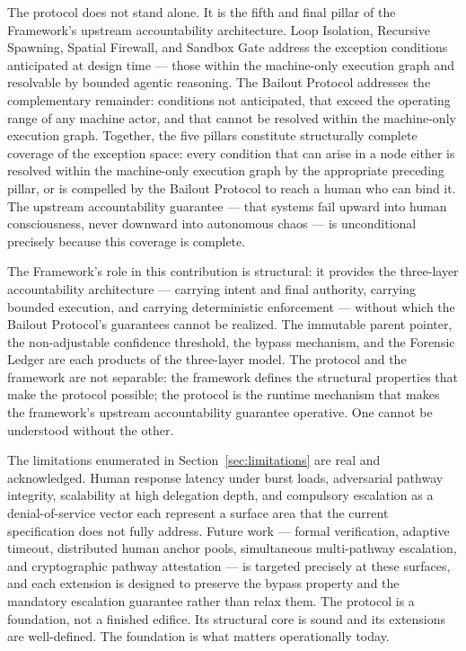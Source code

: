 The protocol does not stand alone. It is the fifth and final pillar of the \bxthree{} Framework's upstream accountability architecture. Loop Isolation, Recursive Spawning, Spatial Firewall, and Sandbox Gate address the exception conditions anticipated at design time — those within the machine-only execution graph and resolvable by bounded agentic reasoning. The Bailout Protocol addresses the complementary remainder: conditions not anticipated, that exceed the operating range of any machine actor, and that cannot be resolved within the machine-only execution graph. Together, the five pillars constitute structurally complete coverage of the exception space: every condition that can arise in a \bxthree{} node either is resolved within the machine-only execution graph by the appropriate preceding pillar, or is compelled by the Bailout Protocol to reach a human who can bind it. The upstream accountability guarantee — that \bxthree{} systems fail upward into human consciousness, never downward into autonomous chaos — is unconditional precisely because this coverage is complete.

The \bxthree{} Framework's role in this contribution is structural: it provides the three-layer accountability architecture — \purpose{} carrying intent and final authority, \bounds{} carrying bounded execution, and \fact{} carrying deterministic enforcement — without which the Bailout Protocol's guarantees cannot be realized. The immutable parent pointer, the non-adjustable confidence threshold, the bypass mechanism, and the Forensic Ledger are each products of the three-layer model. The protocol and the framework are not separable: the framework defines the structural properties that make the protocol possible; the protocol is the runtime mechanism that makes the framework's upstream accountability guarantee operative. One cannot be understood without the other.

The limitations enumerated in Section~\ref{sec:limitations} are real and acknowledged. Human response latency under burst loads, adversarial pathway integrity, scalability at high delegation depth, and compulsory escalation as a denial-of-service vector each represent a surface area that the current specification does not fully address. Future work — formal verification, adaptive timeout, distributed human anchor pools, simultaneous multi-pathway escalation, and cryptographic pathway attestation — is targeted precisely at these surfaces, and each extension is designed to preserve the bypass property and the mandatory escalation guarantee rather than relax them. The protocol is a foundation, not a finished edifice. Its structural core is sound and its extensions are well-defined. The foundation is what matters operationally today.

\endinput